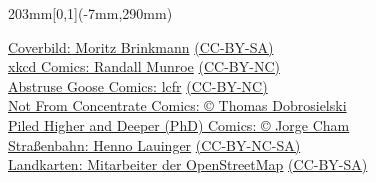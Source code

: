 {    \begin{textblock*}{203mm}[0,1](-7mm,290mm)
        \begin{flushright}
            \footnotesize
            \href{http://mobrinkmann.de}{Coverbild: Moritz Brinkmann} \href{http://creativecommons.org/licenses/by-sa/4.0/}{(CC-BY-SA)}\\ %
            \href{http://xkcd.com/}{xkcd Comics: Randall Munroe} \href{http://creativecommons.org/licenses/by-nc/2.5/}{(CC-BY-NC)}\\
            \href{http://abstrusegoose.com/}{Abstruse Goose Comics: lcfr} \href{http://creativecommons.org/licenses/by-nc/3.0/us/}{(CC-BY-NC)}\\
            \href{http://nfccomic.com/index.php}{Not From Concentrate Comics: \copyright{} Thomas Dobrosielski}\\
            \href{http://www.phdcomics.com/}{Piled Higher and Deeper (PhD) Comics: \copyright{} Jorge Cham}\\
            \href{http://mbah.deviantart.com/art/Evil-Tram-126691939}{Straßenbahn: Henno Lauinger} \href{http://creativecommons.org/licenses/by-nc-sa/3.0/}{(CC-BY-NC-SA)}\\
            \href{http://www.openstreetmap.org/}{Landkarten: Mitarbeiter der OpenStreetMap} \href{http://creativecommons.org/licenses/by-sa/2.0/}{(CC-BY-SA)}
        \end{flushright}
    \end{textblock*}
}

\graphicspath{{./bilder/}{./}}

\newcommand{\dschungel}{
    \marginpar{
        \centering
        \hyperref[dschungel] {
            \texttt{[image: dschungelbuch\_3.pdf]}
        }
    }
}

